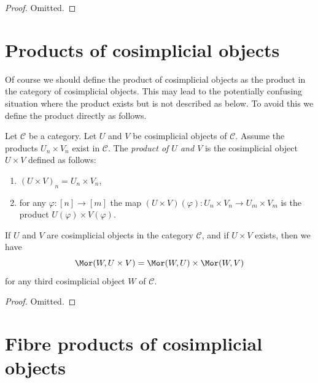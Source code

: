 \begin{proof}
Omitted.
\end{proof}











\section{Products of cosimplicial objects}
\label{section-products-cosimplicial}

\noindent
Of course we should define the product of cosimplicial objects
as the product in the category of cosimplicial objects. This
may lead to the potentially confusing situation where the product exists
but is not described as below. To avoid this we define the product
directly as follows.

\begin{definition}
\label{definition-product-cosimplicial-objects}
Let $\mathcal{C}$ be a category.
Let $U$ and $V$ be cosimplicial objects of $\mathcal{C}$.
Assume the products $U_n \times V_n$ exist in $\mathcal{C}$.
The {\it product of $U$ and $V$} is the cosimplicial object
$U \times V$ defined as follows:
\begin{enumerate}
\item $(U \times V)_n = U_n \times V_n$,
\item for any $\varphi : [n] \to [m]$ the map
$(U \times V)(\varphi) : U_n \times V_n \to U_m \times V_m$
is the product $U(\varphi) \times V(\varphi)$.
\end{enumerate}
\end{definition}

\begin{lemma}
\label{lemma-product-cosimplicial-objects}
If $U$ and $V$ are cosimplicial objects in the category $\mathcal{C}$,
and if $U \times V$ exists, then we have
$$
\Mor(W, U \times V) =
\Mor(W, U) \times
\Mor(W, V)
$$
for any third cosimplicial object $W$ of $\mathcal{C}$.
\end{lemma}

\begin{proof}
Omitted.
\end{proof}

\section{Fibre products of cosimplicial objects}
\label{section-fibre-products-cosimplicial}

